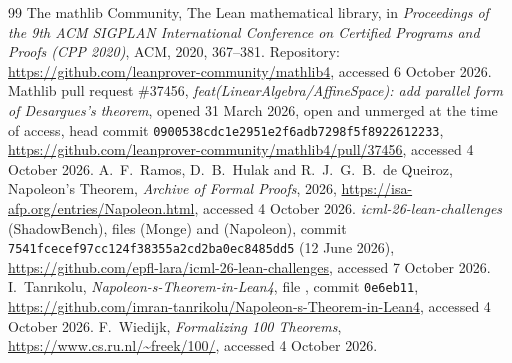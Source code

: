 \documentclass[11pt]{article}
\theoremstyle{definition}
\theoremstyle{remark}
\begin{document}
\begin{thebibliography}{99}
 The mathlib Community, The Lean mathematical library, in \emph{Proceedings of the
9th ACM SIGPLAN International Conference on Certified Programs and Proofs (CPP 2020)}, ACM, 2020,
367--381. Repository: \url{https://github.com/leanprover-community/mathlib4}, accessed 6 October
2026.
 Mathlib pull request \#37456, \emph{feat(LinearAlgebra/AffineSpace): add
parallel form of Desargues's theorem}, opened 31 March 2026, open and unmerged at the time of
access, head commit \texttt{0900538cdc1e2951e2f6adb7298f5f8922612233},
\url{https://github.com/leanprover-community/mathlib4/pull/37456}, accessed 4 October 2026.
 A.~F.~Ramos, D.~B.~Hulak and R.~J.~G.~B.~de Queiroz, Napoleon's Theorem,
\emph{Archive of Formal Proofs}, 2026, \url{https://isa-afp.org/entries/Napoleon.html}, accessed
4 October 2026.
 \emph{icml-26-lean-challenges} (ShadowBench), files
 (Monge) and
 (Napoleon),
commit \texttt{7541fcecef97cc124f38355a2cd2ba0ec8485dd5} (12 June 2026),
\url{https://github.com/epfl-lara/icml-26-lean-challenges}, accessed 7 October 2026.
 I.~Tanr\i{}kolu, \emph{Napoleon-s-Theorem-in-Lean4}, file
, commit \texttt{0e6eb11}, \url{https://github.com/imran-tanrikolu/Napoleon-s-Theorem-in-Lean4},
accessed 4 October 2026.
 F.~Wiedijk, \emph{Formalizing 100 Theorems},
\url{https://www.cs.ru.nl/~freek/100/}, accessed 4 October 2026.
\end{thebibliography}
\end{document}
